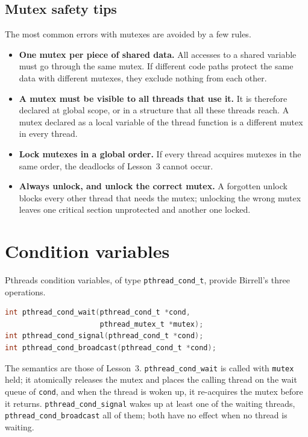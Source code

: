 \documentclass[../main.tex]{subfiles}
\begin{document}
\subsection{Mutex safety tips}

The most common errors with mutexes are avoided by a few rules.
\begin{itemize}
  \item \textbf{One mutex per piece of shared data.}  All accesses to a
    shared variable must go through the same mutex.  If different code
    paths protect the same data with different mutexes, they exclude
    nothing from each other.
  \item \textbf{A mutex must be visible to all threads that use it.}  It is
    therefore declared at global scope, or in a structure that all these
    threads reach.  A mutex declared as a local variable of the thread
    function is a different mutex in every thread.
  \item \textbf{Lock mutexes in a global order.}  If every thread acquires
    mutexes in the same order, the deadlocks of Lesson~3 cannot occur.%
  \item \textbf{Always unlock, and unlock the correct mutex.}  A forgotten
    unlock blocks every other thread that needs the mutex; unlocking the
    wrong mutex leaves one critical section unprotected and another one
    locked.
\end{itemize}

\section{Condition variables}
\label{sec:l04-condvar}

Pthreads condition variables, of type \texttt{pthread\_cond\_t}, provide
Birrell's three operations.
\begin{lstlisting}[language=C, numbers=none]
int pthread_cond_wait(pthread_cond_t *cond,
                      pthread_mutex_t *mutex);
int pthread_cond_signal(pthread_cond_t *cond);
int pthread_cond_broadcast(pthread_cond_t *cond);
\end{lstlisting}
The semantics are those of Lesson~3.  \texttt{pthread\_cond\_wait} is called
with \texttt{mutex} held; it atomically releases the mutex and places the
calling thread on the wait queue of \texttt{cond}, and when the thread is
woken up, it re-acquires the mutex before it returns.
\texttt{pthread\_cond\_signal} wakes up at least one of the waiting
threads, \texttt{pthread\_cond\_broadcast} all of them; both have no effect when no
thread is waiting.
\end{document}
